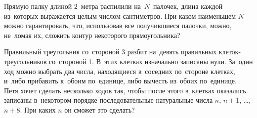 \begin{problems}
\item
Прямую палку длиной $2$~метра распилили на~$N$~палочек, длина каждой из~которых
выражается целым числом сантиметров.
При каком наименьшем $N$ можно гарантировать, что, использовав все получившиеся
палочки, можно, не~ломая их, сложить контур некоторого прямоугольника?

\item
Правильный треугольник со~стороной 3 разбит на~девять правильных
кле\-ток-тре\-уголь\-ников со~стороной 1.
В~этих клетках изначально записаны нули.
За~один ход можно выбрать два числа, находящиеся в~соседних по~стороне клетках,
и~либо прибавить к~обоим по~единице, либо вычесть из~обоих по~единице.
Петя хочет сделать несколько ходов так, чтобы после этого в~клетках оказались
записаны в~некотором порядке последовательные натуральные числа
$n$, $n + 1$, \ldots, $n + 8$.
При каких $n$ он сможет это сделать?

\end{problems}

